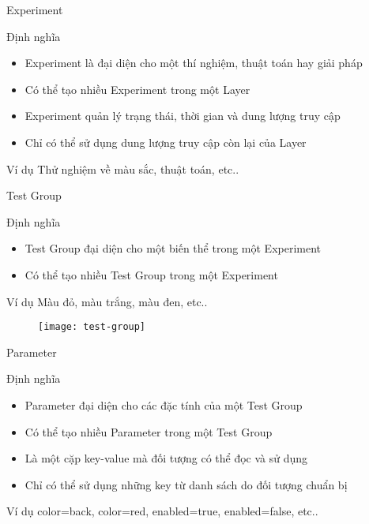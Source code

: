 \begin{frame}{Experiment}
	\begin{block}{Định nghĩa}
		\begin{itemize}
			\item Experiment là đại diện cho một thí nghiệm, thuật toán hay giải pháp
			\item Có thể tạo nhiều Experiment trong một Layer
			\item Experiment quản lý trạng thái, thời gian và dung lượng truy cập
			\item Chỉ có thể sử dụng dung lượng truy cập còn lại của Layer
		\end{itemize}
	\end{block}
	\begin{block}{Ví dụ}
		Thử nghiệm về màu sắc, thuật toán, etc..
	\end{block}
\end{frame}

\begin{frame}{Test Group}
	\begin{block}{Định nghĩa}
		\begin{itemize}
			\item Test Group đại diện cho một biến thể trong một Experiment
			\item Có thể tạo nhiều Test Group trong một Experiment
		\end{itemize}
	\end{block}
	\begin{block}{Ví dụ}
		Màu đỏ, màu trắng, màu đen, etc..
	\end{block}
	\begin{figure}
		\texttt{[image: test-group]}
	\end{figure}
\end{frame}

\begin{frame}{Parameter}
	\begin{block}{Định nghĩa}
		\begin{itemize}
			\item Parameter đại diện cho các đặc tính của một Test Group
			\item Có thể tạo nhiều Parameter trong một Test Group
			\item Là một cặp key-value mà đối tượng có thể đọc và sử dụng
			\item Chỉ có thể sử dụng những key từ danh sách do đối tượng chuẩn bị
		\end{itemize}
	\end{block}
	\begin{block}{Ví dụ}
		color=back, color=red, enabled=true, enabled=false, etc..
	\end{block}
\end{frame}
